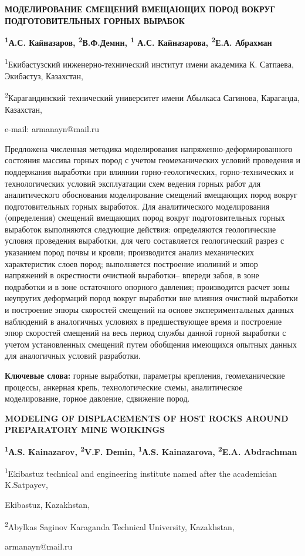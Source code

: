 \begin{center}
{\large\bfseries МОДЕЛИРОВАНИЕ СМЕЩЕНИЙ ВМЕЩАЮЩИХ ПОРОД ВОКРУГ ПОДГОТОВИТЕЛЬНЫХ
ГОРНЫХ ВЫРАБОК}

{\bfseries \textsuperscript{1}А.С. Кайназаров\envelope, \textsuperscript{2}В.Ф.Демин, \textsuperscript{1} А.С. Кайназарова, \textsuperscript{2}Е.А. Абрахман}

\textsuperscript{1}Екибастузский инженерно-технический институт имени
академика К. Сатпаева, Экибастуз, Казахстан,

\textsuperscript{2}Карагандинский технический университет имени Абылкаса
Сагинова, Караганда, Казахстан,

e-mail: armanayn@mail.ru
\end{center}

Предложена численная методика моделирования напряженно-деформированного
состояния массива горных пород с учетом геомеханических условий
проведения и поддержания выработки при влиянии горно-геологических,
горно-технических и технологических условий эксплуатации схем ведения
горных работ для аналитического обоснования моделирование смещений
вмещающих пород вокруг подготовительных горных выработок. Для
аналитического моделирования (определения) смещений вмещающих пород
вокруг подготовительных горных выработок выполняются следующие действия:
определяются геологические условия проведения выработки, для чего
составляется геологический разрез с указанием пород почвы и кровли;
производится анализ механических характеристик слоев пород; выполняется
построение изолиний и эпюр напряжений в окрестности очистной выработки--
впереди забоя, в зоне подработки и в зоне остаточного опорного давления;
производится расчет зоны неупругих деформаций пород вокруг выработки вне
влияния очистной выработки и построение эпюры скоростей смещений на
основе экспериментальных данных наблюдений в аналогичных условиях в
предшествующее время и построение эпюр скоростей смещений на весь период
службы данной горной выработки с учетом установленных смещений путем
обобщения имеющихся опытных данных для аналогичных условий разработки.

{\bfseries Ключевые слова:} горные выработки, параметры крепления,
геомеханические процессы, анкерная крепь, технологические схемы,
аналитическое моделирование, горное давление, сдвижение пород.

\begin{center}
{\large\bfseries MODELING OF DISPLACEMENTS OF HOST ROCKS AROUND PREPARATORY MINE WORKINGS}

{\bfseries \textsuperscript{1}А.S. Kainazarov\envelope, \textsuperscript{2}V.F. Dеmin, \textsuperscript{1}А.S. Kainazarova, \textsuperscript{2}E.A. Abdrachman}

\textsuperscript{1}Ekibastuz technical and engineering institute named
after the academician K.Satpayev,

Ekibastuz, Kazakhstan,

\textsuperscript{2}Abylkas Saginov Karaganda Technical University,
Kazakhstan,

armanayn@mail.ru
\end{center}


